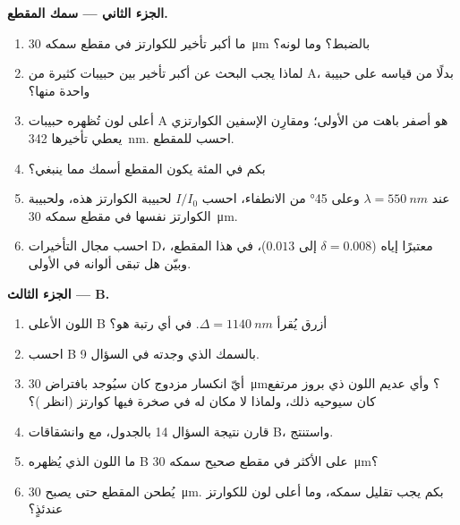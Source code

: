 \begin{problem}
\medskip
\noindent\textbf{الجزء الثاني --- سمك المقطع.}
\begin{enumerate}[resume]
  \item ما أكبر تأخير للكوارتز في مقطع سمكه \qty{30}{\micro m} بالضبط؟ وما لونه؟
  \item لماذا يجب البحث عن أكبر تأخير بين حبيبات كثيرة من A، بدلًا من قياسه على حبيبة واحدة منها؟
  \item أعلى لون تُظهره حبيبات A هو أصفر باهت من  الأولى؛ ومقارِن الإسفين الكوارتزي يعطي تأخيرها \qty{342}{nm}. احسب  للمقطع.
  \item بكم في المئة يكون المقطع أسمك مما ينبغي؟
  \item عند $\lambda = \qty{550}{nm}$ وعلى \ang{45} من الانطفاء، احسب $I/I_0$ لحبيبة الكوارتز هذه، ولحبيبة الكوارتز نفسها في مقطع سمكه \qty{30}{\micro m}.
  \item احسب مجال التأخيرات  D، معتبرًا إياه  ($\delta = 0.008$ إلى $0.013$)، في هذا المقطع، وبيّن هل تبقى ألوانه في  الأولى.
\end{enumerate}

\medskip
\noindent\textbf{الجزء الثالث ---   B.}
\begin{enumerate}[resume]
  \item اللون الأعلى  B أزرق يُقرأ $\Delta = \qty{1140}{nm}$. في أي رتبة هو؟
  \item احسب   B بالسمك الذي وجدته في السؤال 9.
  \item أيّ انكسار مزدوج كان سيُوجد بافتراض \qty{30}{\micro m}؟ وأي  عديم اللون ذي بروز مرتفع كان سيوحيه ذلك، ولماذا لا مكان له في صخرة فيها كوارتز (انظر )؟
  \item قارن نتيجة السؤال 14 بالجدول، مع  وانشقاقات B، واستنتج.
  \item ما اللون الذي يُظهره  B على الأكثر في مقطع صحيح سمكه \qty{30}{\micro m}؟
  \item يُطحن المقطع حتى يصبح \qty{30}{\micro m}. بكم يجب تقليل سمكه، وما أعلى لون للكوارتز عندئذٍ؟
\end{enumerate}


\end{problem}
